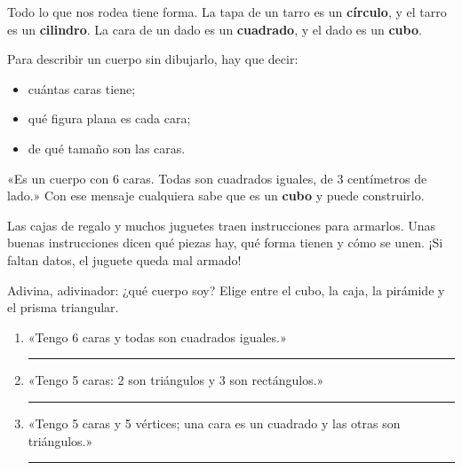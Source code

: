 \documentclass[11pt]{article}
\begin{document}
Todo lo que nos rodea tiene forma. La tapa de un tarro es un
\textbf{círculo}, y el tarro es un \textbf{cilindro}. La cara de un dado es
un \textbf{cuadrado}, y el dado es un \textbf{cubo}.

Para describir un cuerpo sin dibujarlo, hay que decir:
\begin{itemize}
  \item cuántas caras tiene;
  \item qué figura plana es cada cara;
  \item de qué tamaño son las caras.
\end{itemize}

\begin{ejemplo}
«Es un cuerpo con 6 caras. Todas son cuadrados iguales, de 3 centímetros de
lado.» Con ese mensaje cualquiera sabe que es un \textbf{cubo} y puede
construirlo.
\end{ejemplo}

\begin{aplicacion}
Las cajas de regalo y muchos juguetes traen instrucciones para armarlos.
Unas buenas instrucciones dicen qué piezas hay, qué forma tienen y cómo se
unen. ¡Si faltan datos, el juguete queda mal armado!
\end{aplicacion}

\begin{preguntas}
\pregunta Adivina, adivinador: ¿qué cuerpo soy? Elige entre el cubo, la
caja, la pirámide y el prisma triangular.
\begin{enumerate}[label=\alph*)]
  \item «Tengo 6 caras y todas son cuadrados iguales.» \hfill \rule{3.5cm}{0.4pt}
  \item «Tengo 5 caras: 2 son triángulos y 3 son rectángulos.» \hfill \rule{3.5cm}{0.4pt}
  \item «Tengo 5 caras y 5 vértices; una cara es un cuadrado y las otras son
        triángulos.»\\ \hspace*{\fill}\rule{3.5cm}{0.4pt}
\end{enumerate}

\end{preguntas}
\end{document}
